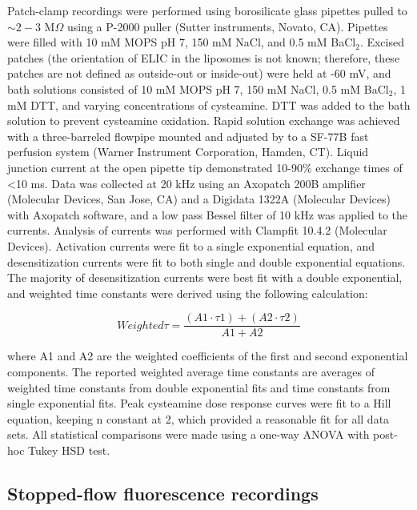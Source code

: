 Patch-clamp recordings were performed using borosilicate glass pipettes
pulled to $\sim2-3$ M$\Omega$ using a P-2000 puller (Sutter
instruments, Novato, CA). Pipettes were filled with 10 mM MOPS pH 7, 150
mM NaCl, and 0.5 mM BaCl$_{2}$. Excised patches (the
orientation of ELIC in the liposomes is not known; therefore, these
patches are not defined as outside-out or inside-out) were held at -60
mV, and bath solutions consisted of 10 mM MOPS pH 7, 150 mM NaCl, 0.5 mM
BaCl$_{2}$, 1 mM DTT, and varying concentrations of
cysteamine. DTT was added to the bath solution to prevent cysteamine
oxidation. Rapid solution exchange was achieved with a three-barreled
flowpipe mounted and adjusted by to a SF-77B fast perfusion system
(Warner Instrument Corporation, Hamden, CT). Liquid junction current at
the open pipette tip demonstrated 10-90\% exchange times of
\textless{}10 ms. Data was collected at 20 kHz using an Axopatch 200B
amplifier (Molecular Devices, San Jose, CA) and a Digidata 1322A
(Molecular Devices) with Axopatch software, and a low pass Bessel filter
of 10 kHz was applied to the currents. Analysis of currents was
performed with Clampfit 10.4.2 (Molecular Devices). Activation currents
were fit to a single exponential equation, and desensitization currents
were fit to both single and double exponential equations. The majority
of desensitization currents were best fit with a double exponential, and
weighted time constants were derived using the following calculation:

\begin{equation}
Weighted \tau = \frac{\left( A1 \cdot \tau 1 \right) + (A2 \cdot \tau 2)}{A1 + A2}
\end{equation}

where A1 and A2 are the weighted coefficients of the first and second
exponential components. The reported weighted average time constants are
averages of weighted time constants from double exponential fits and
time constants from single exponential fits. Peak cysteamine dose
response curves were fit to a Hill equation, keeping n constant at 2,
which provided a reasonable fit for all data sets. All statistical
comparisons were made using a one-way ANOVA with post-hoc Tukey HSD
test.

\subsection{Stopped-flow fluorescence recordings}

